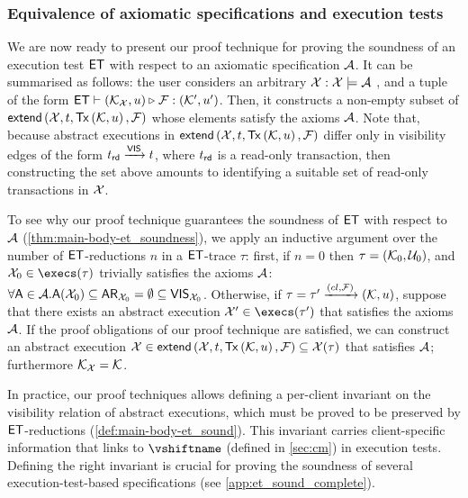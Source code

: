 \subsubsection{Equivalence of axiomatic specifications and execution tests}
We are now ready to present our proof technique for proving the soundness 
of an execution test \(\mathsf{ET}\) with respect to an axiomatic specification \(\mathcal{A}\).
It can be summarised as follows: 
the user considers an arbitrary 
\(\mathcal{X}: \mathcal{X} \models \mathcal{A}\) , and a tuple of the form 
\(\mathsf{ET} \vdash (\mathcal{K}_{\mathcal{X}}, u) \triangleright_{} \mathcal{F}: (\mathcal{K}', u')\). 
Then, it constructs a non-empty subset of \(\extend[\aexec, \txid, \Tx[\hh, \vi], \fp]\) 
whose elements satisfy the axioms \(\mathcal{A}\). Note that, because abstract executions in
\(\extend[\aexec, \txid, \Tx[\hh, \vi], \fp]\) differ only in visibility edges of the form \(t_{\mathsf{rd}}
\xrightarrow{\mathsf{VIS}} t\), where \(t_{\mathsf{rd}}\) is a read-only transaction, 
then constructing the set above amounts to identifying a suitable set of 
read-only transactions in \(\mathcal{X}\).

To see why our proof technique guarantees the soundness of \(\mathsf{ET}\) with respect 
to \(\mathcal{A}\) (\cref{thm:main-body-et_soundness}), we apply an inductive argument over the number of \(\mathsf{ET}\)-reductions \(n\) in a \(\mathsf{ET}\)-trace \(\tau\): 
first, if \(n = 0\) then \(\tau = (\mathcal{K}_{0}, \mathcal{U}_{0})\), and \(\aexec_{0} \in \execs(\tau)\) trivially satisfies the axioms
\(\mathcal{A}\): \(\forall \mathsf{A} \in \mathcal{A}. \mathsf{A}(\mathcal{X}_{0}) \subseteq \mathsf{AR}_{\mathcal{X}_{0}} = \emptyset \subseteq \mathsf{VIS}_{\mathcal{X}_{0}}\). 
Otherwise, if \(\tau = \tau' \xrightarrow{({cl}, \mathcal{F})} (\mathcal{K}, u)\), 
suppose that there exists an abstract execution \(\aexec' \in \execs(\tau')\) that satisfies 
the axioms \(\mathcal{A}\). If the proof obligations of our proof technique are satisfied, we can construct an abstract execution 
\(\aexec \in \extend[\aexec, \txid, \Tx[\hh, \vi], \fp] \subseteq \aexec(\tau)\) that satisfies \(\mathcal{A}\); furthermore \(\mathcal{K}_{\mathcal{X}} = \mathcal{K}\). 

In practice, our proof techniques allows defining a per-client invariant 
on the visibility relation of abstract executions, which must be proved to be preserved by \(\mathsf{ET}\)-reductions (\cref{def:main-body-et_sound}).
This invariant carries client-specific information that links to \( \vshiftname \) (defined in \cref{sec:cm}) in execution tests.
Defining the right invariant is crucial for proving the soundness of several execution-test-based specifications (see \cref{app:et_sound_complete}).

